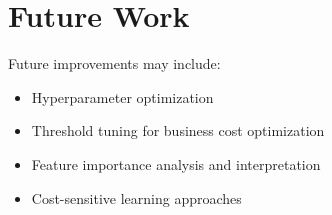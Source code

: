\documentclass[12pt]{article}
\begin{document}
	\section{Future Work}
	
	Future improvements may include:
	
	\begin{itemize}
		\item Hyperparameter optimization
		\item Threshold tuning for business cost optimization
		\item Feature importance analysis and interpretation
		\item Cost-sensitive learning approaches
	\end{itemize}
	
\end{document}
